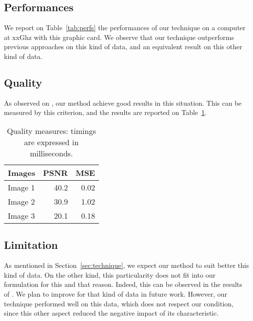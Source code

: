 \documentclass[10pt, conference]{IEEEtran}
\begin{document}
\subsection{Performances}
%
We report on Table~\ref{tab:perfs} the performances of our technique on a computer at xxGhz with this graphic card.
We observe that our technique outperforms previous approaches on this kind of data, and an equivalent result on this other kind of data.



\subsection{Quality}
%
As observed on , our method achieve good results in this situation. 
This can be measured by this criterion, and the results are reported on Table~\ref{tab:quality}.

\begin{table}
\caption{Quality measures: timings are expressed in milliseconds.}
\label{tab:quality}
\centering
\begin{tabular}{l|r|r}
\multicolumn{1}{c}{\bf Images} &
\multicolumn{1}{c|}{\bf PSNR} &
\multicolumn{1}{c}{\bf  MSE} \\ \hline
Image 1	&  40.2	& 0.02 \\
Image 2	&  30.9	& 1.02 \\
Image 3 &  20.1 & 0.18 \\
\end{tabular}
\end{table}


\subsection{Limitation}
%
As mentioned in Section~\ref{sec:technique}, we expect our method to suit better this kind of data. On the other kind, this particularity does not fit into our formulation for this and that reason. Indeed, this can be observed in the results of . 
We plan to improve for that kind of data in future work. However, our technique performed well on this data, which does not respect our condition, since this other aspect reduced the negative impact of its characteristic.
\end{document}
